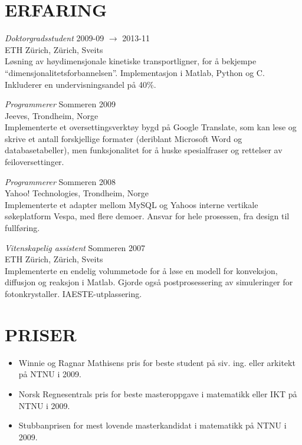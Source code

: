 \documentclass[line,margin]{res}
\newcommand{\zh}{Z\"{u}rich}
\begin{document}
\begin{resume}
\section{ERFARING} 
    {\em Doktorgradsstudent} \hfill 2009-09 $\to$ 2013-11 \\
    ETH \zh, \zh, Sveits \\
    Løsning av høydimensjonale kinetiske transportligner, for å bekjempe
    ``dimensjonalitetsforbannelsen''. Implementasjon i Matlab, Python og C.
    Inkluderer en undervisningsandel på 40\%.

    {\em Programmerer} \hfill Sommeren 2009 \\
    Jeeves, Trondheim, Norge \\
    Implementerte et over\-settings\-verktøy bygd på Google Translate, som
    kan lese og skrive et antall forskjellige formater (deriblant Microsoft
    Word og databasetabeller), men funksjonalitet for å huske spesialfraser
    og rettelser av feil\-over\-settinger.

    {\em Programmerer} \hfill Sommeren 2008 \\
    Yahoo! Technologies, Trondheim, Norge \\
    Implementerte et adapter mellom MySQL og Yahoos interne vertikale 
    søke\-plat\-form Vespa, med flere demoer. Ansvar for hele prosessen, fra
    design til fullføring.

    {\em Vitenskapelig assistent} \hfill Sommeren 2007 \\
    ETH \zh, \zh, Sveits \\
    Implementerte en endelig volum\-metode for å løse en modell for konveksjon,
    diffusjon og reaksjon i Matlab. Gjorde også post\-prosessering av simu\-leringer
    for foton\-krystaller. IAESTE-utplas\-sering.


\section{PRISER}
    \begin{itemize}
        \item Winnie og Ragnar Mathisens pris for beste student på siv. ing. 
            eller arkitekt på NTNU i 2009.
        \item Norsk Regnesentrals pris for beste masteroppgave i matematikk
            eller IKT på NTNU i 2009.
        \item Stubbanprisen for mest lovende masterkandidat i matematikk på
            NTNU i 2009.
    \end{itemize}



\end{resume}
\end{document}
